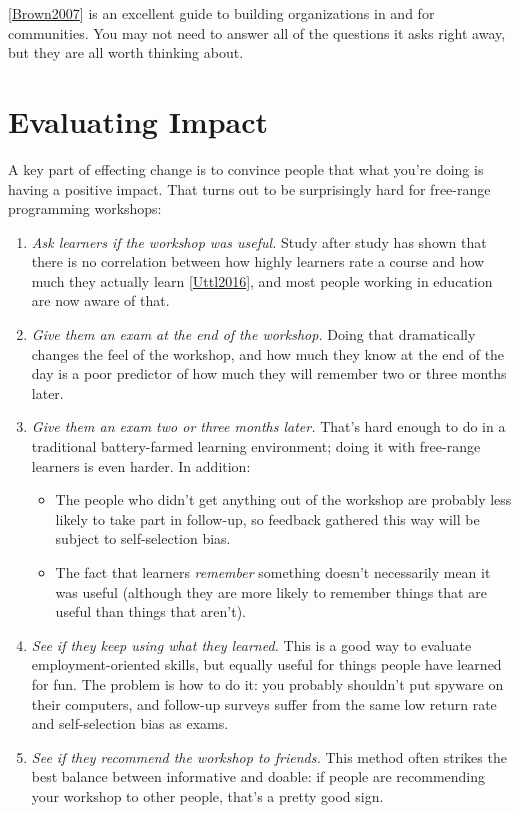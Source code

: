 \documentclass[10pt,statementpaper]{memoir}
\begin{document}
{[}\href{biblio.html\#brown-bpco}{Brown2007}{]} is an excellent guide to
building organizations in and for communities. You may not need to
answer all of the questions it asks right away, but they are all worth
thinking about.

\section{Evaluating Impact}\label{evaluating-impact}

A key part of effecting change is to convince people that what you're
doing is having a positive impact. That turns out to be surprisingly
hard for free-range programming workshops:

\begin{enumerate}
\def\labelenumi{\arabic{enumi}.}
\item
  \emph{Ask learners if the workshop was useful.} Study after study has
  shown that there is no correlation between how highly learners rate a
  course and how much they actually learn
  {[}\href{biblio.html\#uttl-evaluations}{Uttl2016}{]}, and most people
  working in education are now aware of that.
\item
  \emph{Give them an exam at the end of the workshop.} Doing that
  dramatically changes the feel of the workshop, and how much they know
  at the end of the day is a poor predictor of how much they will
  remember two or three months later.
\item
  \emph{Give them an exam two or three months later.} That's hard enough
  to do in a traditional battery-farmed learning environment; doing it
  with free-range learners is even harder. In addition:

  \begin{itemize}
  \item
    The people who didn't get anything out of the workshop are probably
    less likely to take part in follow-up, so feedback gathered this way
    will be subject to self-selection bias.
  \item
    The fact that learners \emph{remember} something doesn't necessarily
    mean it was useful (although they are more likely to remember things
    that are useful than things that aren't).
  \end{itemize}
\item
  \emph{See if they keep using what they learned.} This is a good way to
  evaluate employment-oriented skills, but equally useful for things
  people have learned for fun. The problem is how to do it: you probably
  shouldn't put spyware on their computers, and follow-up surveys suffer
  from the same low return rate and self-selection bias as exams.
\item
  \emph{See if they recommend the workshop to friends.} This method
  often strikes the best balance between informative and doable: if
  people are recommending your workshop to other people, that's a pretty
  good sign.
\end{enumerate}
\end{document}
